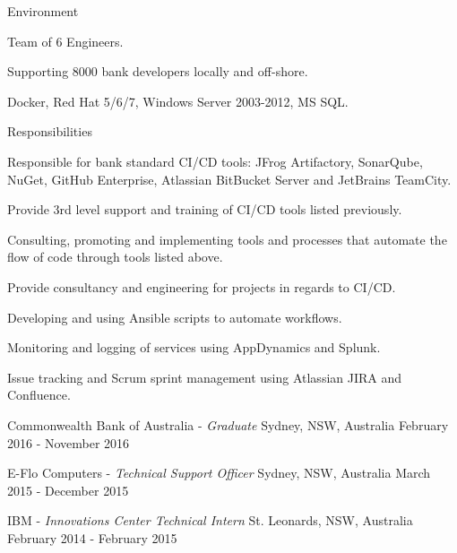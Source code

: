 \begin{cventries}
  \cventry
  {Environment} %
  {} %
  {} %
  {} %
  {
    \begin{cvitems} %
      \item {Team of 6 Engineers.}
      \item {Supporting 8000 bank developers locally and off-shore.}
      \item {Docker, Red Hat 5/6/7, Windows Server 2003-2012, MS SQL.}
    \end{cvitems}
  }

  \cventry
  {Responsibilities} %
  {} %
  {} %
  {} %
  {
    \begin{cvitems} %
      \item {Responsible for bank standard CI/CD tools: JFrog Artifactory, SonarQube, NuGet, GitHub Enterprise, Atlassian BitBucket Server and JetBrains TeamCity.}
      \item {Provide 3rd level support and training of CI/CD tools listed previously.}
      \item {Consulting, promoting and implementing tools and processes that automate the flow of code through tools listed above.}
      \item {Provide consultancy and engineering for projects in regards to CI/CD.}
      \item {Developing and using Ansible scripts to automate workflows.}
      \item {Monitoring and logging of services using AppDynamics and Splunk.}
      \item {Issue tracking and Scrum sprint management using Atlassian JIRA and Confluence.}
    \end{cvitems}
  }

  \cventry
  {} %
  {Commonwealth Bank of Australia - \emph{Graduate}} %
  {Sydney, NSW, Australia} %
  {February 2016 - November 2016} %
  {}


  \cventry
  {} %
  {E-Flo Computers - \emph{Technical Support Officer}} %
  {Sydney, NSW, Australia} %
  {March 2015 - December 2015} %
  {}


  \cventry
  {} %
  {IBM - \emph{Innovations Center Technical Intern}} %
  {St. Leonards, NSW, Australia} %
  {February 2014 - February 2015} %
  {}

\end{cventries}
